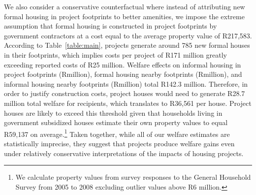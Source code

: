 \documentclass[12pt]{article}
\begin{document}
We also consider a conservative counterfactual where instead of attributing new formal housing in project footprints to better amenities, we impose the extreme assumption that formal housing is constructed in project footprints by government contractors at a cost equal to the average property value of R217,583.  According to Table~\ref{table:main}, projects generate around 785 new formal houses in their footprints, which implies costs per project of R171 million greatly exceeding reported costs of R25 million.  Welfare effects on informal housing in project footprints (Rmillion), formal housing nearby footprints (Rmillion), and informal housing nearby footprints (Rmillion) total R142.3 million.  Therefore, in order to justify construction costs, project houses would need to generate R28.7 million total welfare for recipients, which translates to R36,561 per house.  Project houses are likely to exceed this threshold given that households living in government subsidized houses estimate their own property values to equal R59,137 on average.\footnote{We calculate property values from survey responses to the General Household Survey from 2005 to 2008 excluding outlier values above R6 million.}   Taken together, while all of our welfare estimates are statistically imprecise, they suggest that projects produce welfare gains even under relatively conservative interpretations of the impacts of housing projects.

\end{document}
